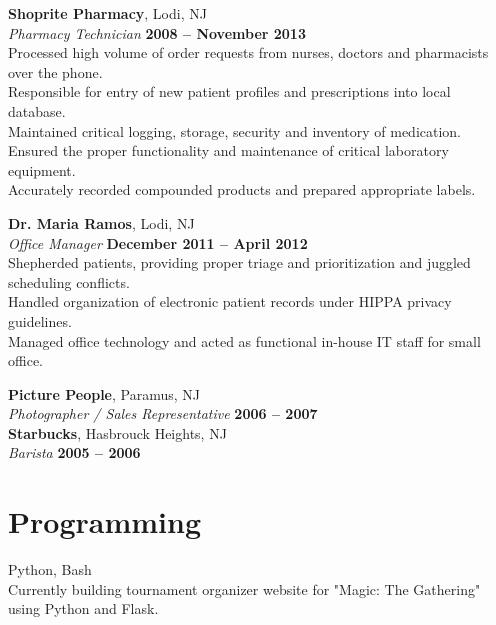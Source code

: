 \documentclass[margin,line]{resume}
\begin{document}
\begin{resume}
    \textbf{Shoprite Pharmacy}, Lodi, NJ \vspace{2mm}\\\vspace{1mm}%
    \textsl{Pharmacy Technician} \hfill \textbf{2008 -- November 2013}\\
    Processed high volume of order requests from nurses, doctors and pharmacists over the phone.\\
    Responsible for entry of new patient profiles and prescriptions into local database.\\
    Maintained critical logging, storage, security and inventory of medication.\\
    Ensured the proper functionality and maintenance of critical laboratory equipment.\\
    Accurately recorded compounded products and prepared appropriate labels.

    \textbf{Dr. Maria Ramos}, Lodi, NJ \vspace{2mm}\\\vspace{1mm}%
    \textsl{Office Manager} \hfill \textbf{December 2011 -- April 2012}\\
    Shepherded patients, providing proper triage and prioritization and juggled scheduling conflicts.\\
    Handled organization of electronic patient records under HIPPA privacy guidelines.\\
    Managed office technology and acted as functional in-house IT staff for small office.

    \textbf{Picture People}, Paramus, NJ \vspace{2mm}\\\vspace{1mm}%
    \textsl{Photographer / Sales Representative} \hfill \textbf{2006 -- 2007}\\

    \textbf{Starbucks}, Hasbrouck Heights, NJ \vspace{2mm}\\\vspace{1mm}%
    \textsl{Barista} \hfill \textbf{2005 -- 2006}\\


    \section{\mysidestyle Programming}
    Python, Bash\\
    Currently building tournament organizer website for "Magic: The Gathering" using Python and Flask.


\end{resume}
\end{document}
